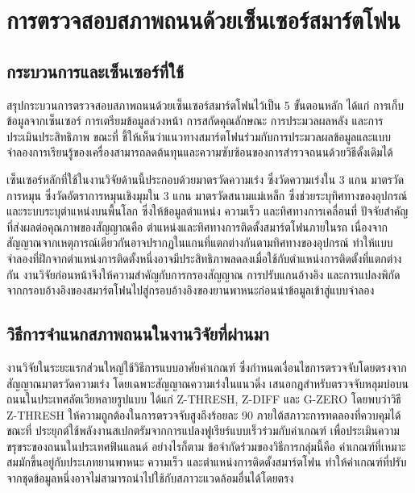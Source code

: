 \section{การตรวจสอบสภาพถนนด้วยเซ็นเซอร์สมาร์ตโฟน}

\subsection{กระบวนการและเซ็นเซอร์ที่ใช้}

\textcite{sattar2018} สรุปกระบวนการตรวจสอบสภาพถนนด้วยเซ็นเซอร์สมาร์ตโฟนไว้เป็น 5 ขั้นตอนหลัก ได้แก่ การเก็บข้อมูลจากเซ็นเซอร์ การเตรียมข้อมูลล่วงหน้า การสกัดคุณลักษณะ การประมวลผลหลัง และการประเมินประสิทธิภาพ ขณะที่ \textcite{alqaydi2024} ชี้ให้เห็นว่าแนวทางสมาร์ตโฟนร่วมกับการประมวลผลข้อมูลและแบบจำลองการเรียนรู้ของเครื่องสามารถลดต้นทุนและความซับซ้อนของการสำรวจถนนด้วยวิธีดั้งเดิมได้

เซ็นเซอร์หลักที่ใช้ในงานวิจัยด้านนี้ประกอบด้วยมาตรวัดความเร่ง ซึ่งวัดความเร่งใน 3 แกน มาตรวัดการหมุน ซึ่งวัดอัตราการหมุนเชิงมุมใน 3 แกน มาตรวัดสนามแม่เหล็ก ซึ่งช่วยระบุทิศทางของอุปกรณ์ และระบบระบุตำแหน่งบนพื้นโลก ซึ่งให้ข้อมูลตำแหน่ง ความเร็ว และทิศทางการเคลื่อนที่ ปัจจัยสำคัญที่ส่งผลต่อคุณภาพของสัญญาณคือ ตำแหน่งและทิศทางการติดตั้งสมาร์ตโฟนภายในรถ เนื่องจากสัญญาณจากเหตุการณ์เดียวกันอาจปรากฏในแกนที่แตกต่างกันตามทิศทางของอุปกรณ์ ทำให้แบบจำลองที่ฝึกจากตำแหน่งการติดตั้งหนึ่งอาจมีประสิทธิภาพลดลงเมื่อใช้กับตำแหน่งการติดตั้งที่แตกต่างกัน งานวิจัยก่อนหน้าจึงให้ความสำคัญกับการกรองสัญญาณ การปรับแกนอ้างอิง และการแปลงพิกัดจากกรอบอ้างอิงของสมาร์ตโฟนไปสู่กรอบอ้างอิงของยานพาหนะก่อนนำข้อมูลเข้าสู่แบบจำลอง \parencite{sattar2018,alqaydi2024}

\subsection{วิธีการจำแนกสภาพถนนในงานวิจัยที่ผ่านมา}

งานวิจัยในระยะแรกส่วนใหญ่ใช้วิธีการแบบอาศัยค่าเกณฑ์ ซึ่งกำหนดเงื่อนไขการตรวจจับโดยตรงจากสัญญาณมาตรวัดความเร่ง โดยเฉพาะสัญญาณความเร่งในแนวดิ่ง \textcite{mednis2011} เสนอกฎสำหรับตรวจจับหลุมบ่อบนถนนในประเทศลัตเวียหลายรูปแบบ ได้แก่ Z-THRESH, Z-DIFF และ G-ZERO โดยพบว่าวิธี Z-THRESH ให้ความถูกต้องในการตรวจจับสูงถึงร้อยละ 90 ภายใต้สภาวะการทดลองที่ควบคุมได้ ขณะที่ \textcite{perttunen2011} ประยุกต์ใช้พลังงานสเปกตรัมจากการแปลงฟูเรียร์แบบเร็วร่วมกับค่าเกณฑ์ เพื่อประเมินความขรุขระของถนนในประเทศฟินแลนด์ อย่างไรก็ตาม ข้อจำกัดร่วมของวิธีการกลุ่มนี้คือ ค่าเกณฑ์ที่เหมาะสมมักขึ้นอยู่กับประเภทยานพาหนะ ความเร็ว และตำแหน่งการติดตั้งสมาร์ตโฟน ทำให้ค่าเกณฑ์ที่ปรับจากชุดข้อมูลหนึ่งอาจไม่สามารถนำไปใช้กับสภาวะแวดล้อมอื่นได้โดยตรง \parencite{sattar2018,alqaydi2024}

